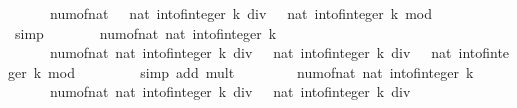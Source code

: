 \begin{isabellebody}
\ \ \ \ \ \ num{\isacharunderscore}{\kern0pt}of{\isacharunderscore}{\kern0pt}nat\ {\isacharparenleft}{\kern0pt}{}\ {\isacharasterisk}{\kern0pt}\ {\isacharparenleft}{\kern0pt}nat\ {\isacharparenleft}{\kern0pt}int{\isacharunderscore}{\kern0pt}of{\isacharunderscore}{\kern0pt}integer\ k{\isacharparenright}{\kern0pt}\ div\ {}{\isacharparenright}{\kern0pt}\ {\isacharplus}{\kern0pt}\ nat\ {\isacharparenleft}{\kern0pt}int{\isacharunderscore}{\kern0pt}of{\isacharunderscore}{\kern0pt}integer\ k{\isacharparenright}{\kern0pt}\ mod\ {}{\isacharparenright}{\kern0pt}{\isachardoublequoteclose}\isanewline
\ \ \ \ \ \ \isamarkupfalse%
\ simp\isanewline
\ \ \ \ \isamarkupfalse%
\ \isamarkupfalse%
\ {\isachardoublequoteopen}num{\isacharunderscore}{\kern0pt}of{\isacharunderscore}{\kern0pt}nat\ {\isacharparenleft}{\kern0pt}nat\ {\isacharparenleft}{\kern0pt}int{\isacharunderscore}{\kern0pt}of{\isacharunderscore}{\kern0pt}integer\ k{\isacharparenright}{\kern0pt}{\isacharparenright}{\kern0pt}\ {\isacharequal}{\kern0pt}\isanewline
\ \ \ \ \ \ num{\isacharunderscore}{\kern0pt}of{\isacharunderscore}{\kern0pt}nat\ {\isacharparenleft}{\kern0pt}nat\ {\isacharparenleft}{\kern0pt}int{\isacharunderscore}{\kern0pt}of{\isacharunderscore}{\kern0pt}integer\ k{\isacharparenright}{\kern0pt}\ div\ {}\ {\isacharplus}{\kern0pt}\ nat\ {\isacharparenleft}{\kern0pt}int{\isacharunderscore}{\kern0pt}of{\isacharunderscore}{\kern0pt}integer\ k{\isacharparenright}{\kern0pt}\ div\ {}\ {\isacharplus}{\kern0pt}\ nat\ {\isacharparenleft}{\kern0pt}int{\isacharunderscore}{\kern0pt}of{\isacharunderscore}{\kern0pt}integer\ k{\isacharparenright}{\kern0pt}\ mod\ {}{\isacharparenright}{\kern0pt}{\isachardoublequoteclose}\isanewline
\ \ \ \ \ \ \isamarkupfalse%
\ {\isacharparenleft}{\kern0pt}simp\ add{\isacharcolon}{\kern0pt}\ mult{\isacharunderscore}{\kern0pt}{}{\isacharparenright}{\kern0pt}\isanewline
\ \ \ \ \isamarkupfalse%
\ {\isacharasterisk}{\kern0pt}{\isacharasterisk}{\kern0pt}\ \isamarkupfalse%
\ {\isachardoublequoteopen}num{\isacharunderscore}{\kern0pt}of{\isacharunderscore}{\kern0pt}nat\ {\isacharparenleft}{\kern0pt}nat\ {\isacharparenleft}{\kern0pt}int{\isacharunderscore}{\kern0pt}of{\isacharunderscore}{\kern0pt}integer\ k{\isacharparenright}{\kern0pt}{\isacharparenright}{\kern0pt}\ {\isacharequal}{\kern0pt}\isanewline
\ \ \ \ \ \ num{\isacharunderscore}{\kern0pt}of{\isacharunderscore}{\kern0pt}nat\ {\isacharparenleft}{\kern0pt}nat\ {\isacharparenleft}{\kern0pt}int{\isacharunderscore}{\kern0pt}of{\isacharunderscore}{\kern0pt}integer\ k{\isacharparenright}{\kern0pt}\ div\ {}\ {\isacharplus}{\kern0pt}\ nat\ {\isacharparenleft}{\kern0pt}int{\isacharunderscore}{\kern0pt}of{\isacharunderscore}{\kern0pt}integer\ k{\isacharparenright}{\kern0pt}\ div\ {}\ {\isacharplus}{\kern0pt}\ {}{\isacharparenright}{\kern0pt}{\isachardoublequoteclose}\isanewline

\end{isabellebody}

